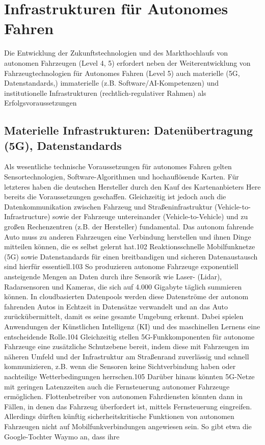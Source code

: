 \section{Infrastrukturen für Autonomes Fahren}
Die Entwicklung der Zukunftstechnologien und des Markthochlaufs von autonomen Fahrzeugen (Level 4, 5) erfordert neben der Weiterentwicklung von Fahrzeugtechnologien für Autonomes Fahren (Level 5) auch materielle (5G, Datenstandards,)
immaterielle (z.B. Software/AI-Kompetenzen) und institutionelle Infrastrukturen
(rechtlich-regulativer Rahmen) als Erfolgsvoraussetzungen
\subsection{Materielle Infrastrukturen: Datenübertragung (5G), Datenstandards}
Als wesentliche technische Voraussetzungen für autonomes Fahren gelten Sensortechnologien, Software-Algorithmen und hochauflösende Karten. Für letzteres
haben die deutschen Hersteller durch den Kauf des Kartenanbieters Here bereits
die Voraussetzungen geschaffen. Gleichzeitig ist jedoch auch die Datenkommunikation zwischen Fahrzeug und Straßeninfrastruktur (Vehicle-to-Infrastructure) sowie der Fahrzeuge untereinander (Vehicle-to-Vehicle) und zu großen Rechenzentren (z.B. der Hersteller) fundamental. Das autonom fahrende Auto muss zu anderen
Fahrzeugen eine Verbindung herstellen und ihnen Dinge mitteilen können, die es
selbst gelernt hat.102 Reaktionsschnelle Mobilfunknetze (5G) sowie Datenstandards
für einen breitbandigen und sicheren Datenaustausch sind hierfür essentiell.103
So produzieren autonome Fahrzeuge exponentiell ansteigende Mengen an Daten
durch ihre Sensorik wie Laser- (Lidar), Radarsensoren und Kameras, die sich auf
4.000 Gigabyte täglich summieren können. In cloudbasierten Datenpools werden
diese Datenströme der autonom fahrenden Autos in Echtzeit in Datensätze verwandelt und an das Auto zurückübermittelt, damit es seine gesamte Umgebung
erkennt. Dabei spielen Anwendungen der Künstlichen Intelligenz (KI) und des
maschinellen Lernens eine entscheidende Rolle.104
Gleichzeitig stellen 5G-Funkkomponenten für autonome Fahrzeuge eine
zusätzliche Schutzebene bereit, indem diese mit Fahrzeugen im näheren Umfeld
und der Infrastruktur am Straßenrand zuverlässig und schnell kommunizieren,
z.B. wenn die Sensoren keine Sichtverbindung haben oder nachteilige Wetterbedingungen herrschen.105 Darüber hinaus könnten 5G-Netze mit geringen Latenzzeiten auch die Fernsteuerung autonomer Fahrzeuge ermöglichen. Flottenbetreiber
von autonomen Fahrdiensten könnten dann in Fällen, in denen das Fahrzeug überfordert ist, mittels Fernsteuerung eingreifen. Allerdings dürften künftig sicherheitskritische Funktionen von autonomen Fahrzeugen nicht auf Mobilfunkverbindungen angewiesen sein. So gibt etwa die Google-Tochter Waymo an, dass ihre
